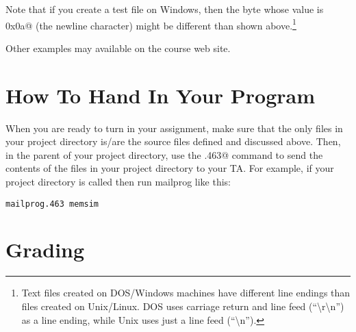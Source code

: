 \documentclass[11pt]{article}
\begin{document}
Note that if you create a test file on Windows, then the byte whose value is \verb@0x0a@
(the newline character) might be different than shown above.\footnote{
Text files created on DOS/Windows machines have different line endings than files 
created on Unix/Linux. DOS uses carriage return and line feed 
(``\textbackslash r\textbackslash n'') as a line ending, while Unix uses 
just a line feed (``\textbackslash n'').}

Other examples may available on the course web site.


\section{How To Hand In Your Program}

When you are ready to turn in your assignment, make sure that the only files in your
project directory is/are the source files defined and discussed above.
Then, in the parent of your project directory, use the \verb@mailprog.463@ 
command to send the contents of the files in your project directory to 
your TA.  For example, if your project directory is called \verb@memsim@ then
run mailprog like this:

\begin{verbatim}
mailprog.463 memsim
\end{verbatim}

%
%
%

\section{Grading}
\end{document}
